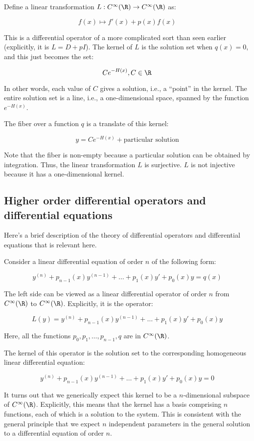 \documentclass[10pt]{amsart}
\begin{document}
Define a linear transformation $L:C^\infty(\R) \to C^\infty(\R)$ as:

$$f(x) \mapsto f'(x) + p(x)f(x)$$

This is a differential operator of a more complicated sort than seen
earlier (explicitly, it is $L = D + pI$). The kernel of $L$ is the
solution set when $q(x) = 0$, and this just becomes the set:

$$Ce^{-H(x)}, C \in \R$$

In other words, each value of $C$ gives a solution, i.e., a ``point''
in the kernel. The entire solution set is a line, i.e., a
one-dimensional space, spanned by the function $e^{-H(x)}$.

The fiber over a function $q$ is a translate of this kernel:

$$y = Ce^{-H(x)} + \text{particular solution}$$

Note that the fiber is non-empty because a particular solution can be
obtained by integration. Thus, the linear transformation $L$ is
surjective. $L$ is not injective because it has a one-dimensional
kernel.

\subsection{Higher order differential operators and differential equations}

Here's a brief description of the theory of differential operators and
differential equations that is relevant here.

Consider a linear differential equation of order $n$ of the following
form:

$$y^{(n)} + p_{n-1}(x)y^{(n-1)} + \dots + p_1(x)y' + p_0(x)y = q(x)$$

The left side can be viewed as a linear differential operator of order
$n$ from $C^\infty(\R)$ to $C^\infty(\R)$. Explicitly, it is the operator:

$$L(y) = y^{(n)} + p_{n-1}(x)y^{(n-1)} + \dots + p_1(x)y' + p_0(x)y$$

Here, all the functions $p_0,p_1,\dots,p_{n-1},q$ are in
$C^\infty(\R)$.

The kernel of this operator is the solution set to the corresponding
homogeneous linear differential equation:

$$y^{(n)} + p_{n-1}(x)y^{(n-1)} + \dots + p_1(x)y' + p_0(x)y = 0$$

It turns out that we generically expect this kernel to be a
$n$-dimensional subspace of $C^\infty(\R)$. Explicitly, this means
that the kernel has a basis comprising $n$ functions, each of which is
a solution to the system. This is consistent with the general
principle that we expect $n$ independent parameters in the general
solution to a differential equation of order $n$.
\end{document}
